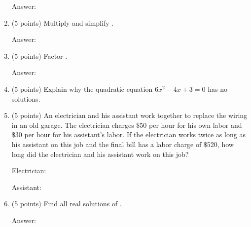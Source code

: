 \documentclass[12pt]{article}
\begin{document}
\begin{enumerate}
\hfill { Answer:\underline{\hspace{2in}}}\vfill
\item (5 points) Multiply and simplify .
\begin{flushright}{ Answer:\underline{\hspace{2in}}}\end{flushright}
\vfill
\item (5 points) Factor \scalebox{1.2}{$1000-27y^3$}.
\begin{flushright}{ Answer:\underline{\hspace{2in}}}\end{flushright}
\vspace{.75in}
\item (5 points) Explain why the quadratic equation $6x^2-4x+3=0$ has  no solutions.
\vspace{.75in}
\newpage
\item (5 points) An electrician and his assistant work together to replace the wiring in an old garage. The electrician charges \$50 per hour for his own labor and \$30 per hour for his assistant's labor. If the electrician works twice as long as his assistant on this job and the final bill has a labor charge of \$520, how long did the electrician and his assistant work on this job?
\begin{flushright}{ Electrician:\underline{\hspace{2in}}}\end{flushright}
\begin{flushright}{ Assistant:\underline{\hspace{2in}}}\end{flushright}
\vfill
\item (5 points) Find all real solutions of . 
\begin{flushright}{ Answer:\underline{\hspace{2in}}}\end{flushright}
\vfill


\end{enumerate}
\end{document}
